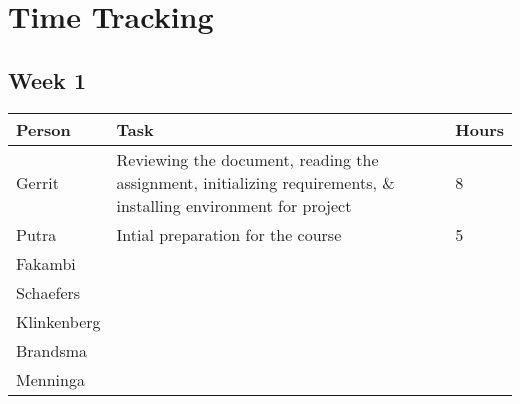 \chapter{Time Tracking}
\label{App: Time Tracking}

\section{Week 1}
\begin{tabularx}{\textwidth}{ l l l}
    \textbf{Person} & \textbf{Task} & Hours \\ \hline
	Gerrit & Reviewing the document, reading the assignment, initializing requirements, \& installing environment for project & 8 \\
	Putra & Intial preparation for the course & 5 \\
	Fakambi & & \\
	Schaefers & & \\
	Klinkenberg & & \\
	Brandsma & & \\
	Menninga & & \\
\end{tabularx}